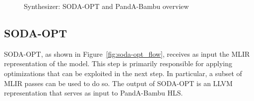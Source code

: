 \begin{figure}[t]
    \centering
    \hspace{0.03\textwidth}
    \caption{Synthesizer: SODA-OPT and PandA-Bambu overview~\cite{9786533}}
    \label{fig:synthesizer_flow}
\end{figure}

\subsection{SODA-OPT}
\label{subsec:toolchain-soda_opt}%

SODA-OPT, as shown in Figure~\ref{fig:soda-opt_flow}, receives as input the MLIR representation of the model.
This step is primarily responsible for applying optimizations that can be exploited in the next step.
In particular, a subset of MLIR passes can be used to do so.
The output of SODA-OPT is an LLVM representation that serves as input to PandA-Bambu HLS\@.

